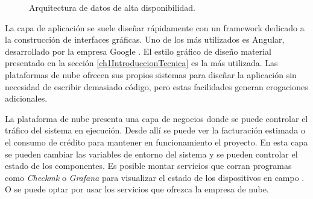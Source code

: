 \begin{figure}[h]
	\centering
	\caption{Arquitectura de datos de alta disponibilidad.}
	\label{fig:ch1DatosAltaDisponibilidad}
\end{figure}

La capa de aplicación se suele diseñar rápidamente con un framework dedicado a la construcción de interfaces gráficas.
Uno de los más utilizados es Angular, desarrollado por la empresa Google \citep{WEBSITE:Angulario}.
El estilo gráfico de diseño material presentado en la sección \ref{ch1IntroduccionTecnica} es la más utilizada.
Las plataformas de nube ofrecen sus propios sistemas para diseñar la aplicación sin necesidad de escribir demasiado código, pero estas facilidades generan erogaciones adicionales.

La plataforma de nube presenta una capa de negocios donde se puede controlar el tráfico del sistema en ejecución.
Desde allí se puede ver la facturación estimada o el consumo de crédito para mantener en funcionamiento el proyecto.
En esta capa se pueden cambiar las variables de entorno del sistema y se pueden controlar el estado de los componentes.
Es posible montar servicios que corran programas como \emph{Checkmk} o \emph{Grafana} para visualizar el estado de los dispositivos en campo \citep{betke2017real}. O se puede optar por usar los servicios que ofrezca la empresa de nube.

